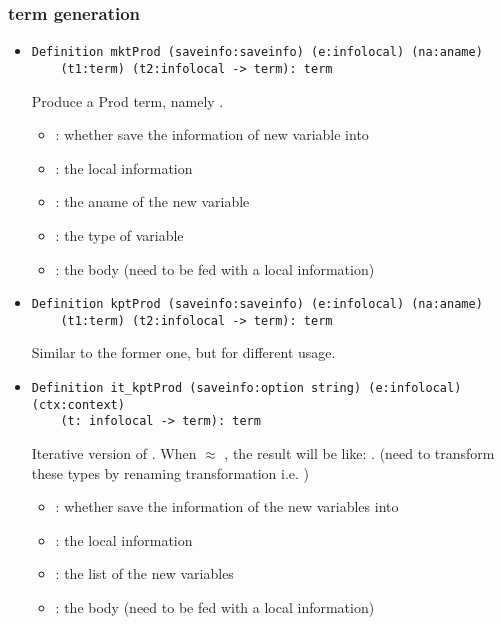 \documentclass[a4paper,UKenglish,cleveref, autoref, thm-restate]{lipics-v2021}
\begin{document}
\subsubsection{term generation}
\begin{itemize}

\item
\begin{lstlisting}[language = {Coq}, basicstyle = \small]
Definition mktProd (saveinfo:saveinfo) (e:infolocal) (na:aname)
    (t1:term) (t2:infolocal -> term): term
\end{lstlisting}
Produce a Prod term, namely .
\begin{itemize}
    \item {}: whether save the information of new variable into 
    \item {}: the local information
    \item {}: the aname of the new variable
    \item {}: the type of variable
    \item {}: the body (need to be fed with a local information)
\end{itemize}



\item
\begin{lstlisting}[language = {Coq}, basicstyle = \small]
Definition kptProd (saveinfo:saveinfo) (e:infolocal) (na:aname)
    (t1:term) (t2:infolocal -> term): term
\end{lstlisting}
Similar to the former one, but for different usage.

\item
\begin{lstlisting}[language = {Coq}, basicstyle = \small]
Definition it_kptProd (saveinfo:option string) (e:infolocal) (ctx:context)
    (t: infolocal -> term): term
\end{lstlisting}
Iterative version of .
When  $\approx$ \coqe{[vk; ... v2; v1]}, the result will be like:
. (need to transform these types by renaming transformation i.e. )
\begin{itemize}
    \item {}: whether save the information of the new variables into 
    \item {}: the local information
    \item {}: the list of the new variables
    \item {}: the body (need to be fed with a local information)
\end{itemize}


\end{itemize}
\end{document}
